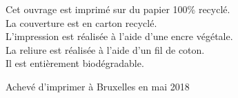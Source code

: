 \begin{center}
    \footnotesize

    Cet ouvrage est imprimé sur du papier 100\% recyclé.\\
    La couverture est en carton recyclé.\\
    L'impression est réalisée à l'aide d'une encre végétale.\\
    La reliure est réalisée à l'aide d'un fil de coton.\\
    Il est entièrement biodégradable.


    Achevé d'imprimer à Bruxelles en mai 2018


    

    \normalsize
\end{center}

